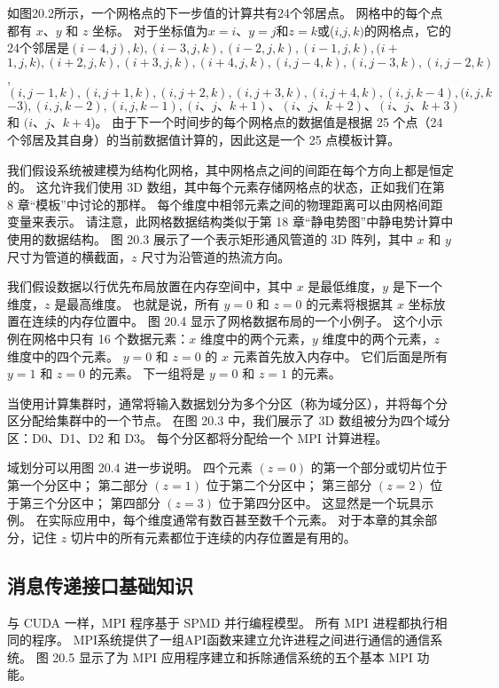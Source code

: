 如图20.2所示，一个网格点的下一步值的计算共有24个邻居点。 网格中的每个点都有 $x、y$ 和 $z$ 坐标。 对于坐标值为$x=i、y=j$和$z=k$或($i$,$j,k)$的网格点，它的24个邻居是$(i-4,j) , k),(i-3, j, k),(i-2, j, k),(i-1, j, k),(i+$ $1, j, k),(i+2, j , k),(i+3, j, k),(i+4, j, k),(i, j-4, k),(i, j-3, k),(i, j-2 , k)$, $(i, j-1, k),(i, j+1, k),(i, j+2, k),(i, j+3, k),(i, j +4, k),(i, j, k-4),(i, j, k$ $-3),(i, j, k-2),(i, j, k-1),(i 、j、k+1)、(i、j、k+2)、(i、j、k+3)$ 和 $(i、j、k+$4)。 由于下一个时间步的每个网格点的数据值是根据 25 个点（24 个邻居及其自身）的当前数据值计算的，因此这是一个 25 点模板计算。

我们假设系统被建模为结构化网格，其中网格点之间的间距在每个方向上都是恒定的。 这允许我们使用 3D 数组，其中每个元素存储网格点的状态，正如我们在第 8 章“模板”中讨论的那样。 每个维度中相邻元素之间的物理距离可以由网格间距变量来表示。 请注意，此网格数据结构类似于第 18 章“静电势图”中静电势计算中使用的数据结构。 图 20.3 展示了一个表示矩形通风管道的 3D 阵列，其中 $x$ 和 $y$ 尺寸为管道的横截面，$z$ 尺寸为沿管道的热流方向。

我们假设数据以行优先布局放置在内存空间中，其中 $x$ 是最低维度，$y$ 是下一个维度，$z$ 是最高维度。 也就是说，所有 $y=0$ 和 $z=0$ 的元素将根据其 $x$ 坐标放置在连续的内存位置中。 图 20.4 显示了网格数据布局的一个小例子。 这个小示例在网格中只有 16 个数据元素：$x$ 维度中的两个元素，$y$ 维度中的两个元素，$z$ 维度中的四个元素。 $y=0$ 和 $z=0$ 的 $x$ 元素首先放入内存中。 它们后面是所有 $y=1$ 和 $z=0$ 的元素。 下一组将是 $y=0$ 和 $z=1$ 的元素。

当使用计算集群时，通常将输入数据划分为多个分区（称为域分区），并将每个分区分配给集群中的一个节点。 在图 20.3 中，我们展示了 3D 数组被分为四个域分区：D0、D1、D2 和 D3。 每个分区都将分配给一个 MPI 计算进程。

域划分可以用图 20.4 进一步说明。 四个元素 $(z=0)$ 的第一个部分或切片位于第一个分区中； 第二部分 $(z=1)$ 位于第二个分区中； 第三部分 $(z=2)$ 位于第三个分区中； 第四部分 $(z=3)$ 位于第四分区中。 这显然是一个玩具示例。 在实际应用中，每个维度通常有数百甚至数千个元素。 对于本章的其余部分，记住 $z$ 切片中的所有元素都位于连续的内存位置是有用的。

\subsection{消息传递接口基础知识}
与 CUDA 一样，MPI 程序基于 SPMD 并行编程模型。 所有 MPI 进程都执行相同的程序。 MPI系统提供了一组API函数来建立允许进程之间进行通信的通信系统。 图 20.5 显示了为 MPI 应用程序建立和拆除通信系统的五个基本 MPI 功能。

